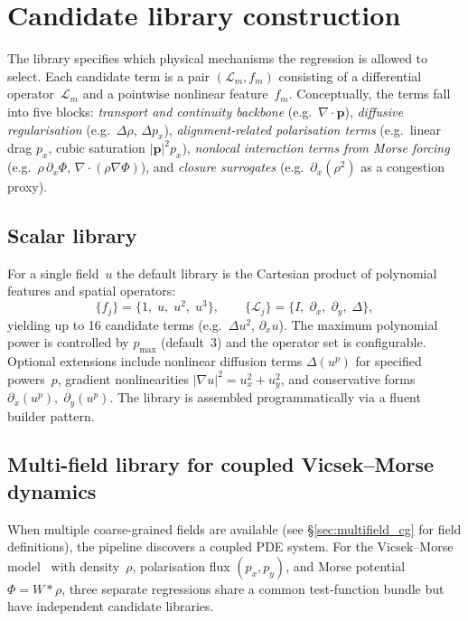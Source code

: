 \section{Candidate library construction}
\label{sec:library}

The library specifies which physical mechanisms the regression is allowed
to select.  Each candidate term is a pair $(\mathcal{L}_m, f_m)$
consisting of a differential operator~$\mathcal{L}_m$ and a pointwise
nonlinear feature~$f_m$.  Conceptually, the terms fall into five blocks:
\emph{transport and continuity backbone}
(e.g.\ $\nabla\!\cdot\!\mathbf{p}$),
\emph{diffusive regularisation}
(e.g.\ $\Delta\rho$, $\Delta p_x$),
\emph{alignment-related polarisation terms}
(e.g.\ linear drag $p_x$, cubic saturation $|\mathbf{p}|^2 p_x$),
\emph{nonlocal interaction terms from Morse forcing}
(e.g.\ $\rho\,\partial_x\Phi$, $\nabla\!\cdot\!(\rho\nabla\Phi)$),
and \emph{closure surrogates}
(e.g.\ $\partial_x(\rho^2)$ as a congestion proxy).

\subsection{Scalar library}
\label{subsec:scalar_library}

For a single field~$u$ the default library is the Cartesian product of
polynomial features and spatial operators:
\begin{equation}
  \bigl\{f_j\bigr\} = \{1,\;u,\;u^2,\;u^3\},
  \qquad
  \bigl\{\mathcal{L}_j\bigr\}
  = \{I,\;\partial_x,\;\partial_y,\;\Delta\},
  \label{eq:scalar_library}
\end{equation}
yielding up to 16 candidate terms (e.g.\ $\Delta u^2$, $\partial_x u$).
The maximum polynomial power is controlled by $p_{\max}$ (default~$3$)
and the operator set is configurable.  Optional extensions
include
nonlinear diffusion terms $\Delta(u^p)$ for specified powers~$p$,
gradient nonlinearities $|\nabla u|^2 = u_x^2+u_y^2$,
and conservative forms $\partial_x(u^p),\;\partial_y(u^p)$.
The library is assembled programmatically via a fluent builder pattern.

\subsection{Multi-field library for coupled Vicsek--Morse dynamics}
\label{subsec:multifield_library}

When multiple coarse-grained fields are available
(see \S\ref{sec:multifield_cg} for field definitions), the pipeline
discovers a coupled PDE system.  For the Vicsek--Morse model~\cite{vicsek1995vicsek,dorsogna2006morse} with
density~$\rho$, polarisation flux $(p_x,p_y)$, and Morse
potential~$\Phi=W*\rho$, three separate regressions share a common
test-function bundle but have independent candidate libraries.

